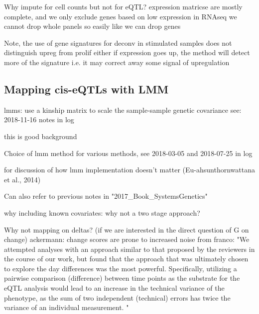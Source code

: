 Why impute for cell counts but not for eQTL?
expression matricse are mostly complete, and we only exclude genes based on low expression in RNAseq
we cannot drop whole panels so easily like we can drop genes

Note, the use of gene signatures for deconv
    in stimulated samples
    does not distinguish upreg from prolif either
    if expression goes up, the method will detect more of the signature
    i.e. it may correct away some signal of upregulation


\subsection{Mapping cis-eQTLs with LMM}

lmms: use a kinship matrix to scale the sample-sample genetic covariance
see: 2018-11-16 notes in log

this is good background

Choice of lmm method
for various methods, see 2018-03-05 and 2018-07-25 in log

for discussion of how lmm implementation doesn't matter (Eu-ahsunthornwattana et al., 2014)

Can also refer to previous notes in "2017\_Book\_SystemsGenetics"

why including known covariates: why not a two stage approach?

Why not mapping on deltas? (if we are interested in the direct question of G on change)
    ackermann: change scores are prone to increased noise
    from franco: "We attempted analyses with an approach similar to that proposed by the reviewers in the course of our work, but found that the approach that was ultimately chosen to explore the day differences was the most powerful. Specifically, utilizing a pairwise comparison (difference) between time points as the substrate for the eQTL analysis would lead to an increase in the technical variance of the phenotype, as the sum of two independent (technical) errors has twice the variance of an individual measurement. "

